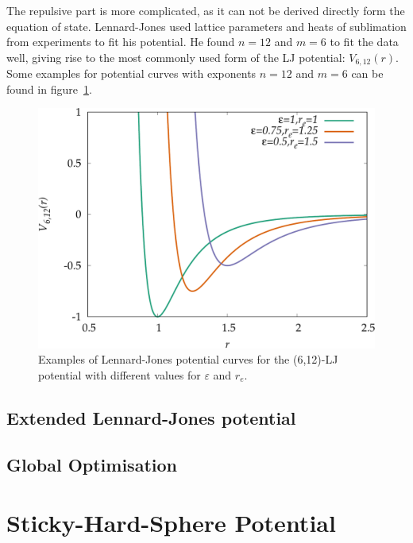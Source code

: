 The repulsive part is more complicated, as it can not be derived directly form
the equation of state. Lennard-Jones used lattice parameters and heats of
sublimation from experiments to fit his potential. He found $n=12$ and $m=6$ to
fit the data well, giving rise to the most commonly used form of the \ac{LJ}
potential: $V_{6,12}(r)$.\autocite{Lennard-Jones_Cohesion_1931} Some examples
for potential curves with exponents $n=12$ and $m=6$ can be found in
figure~\ref{fig:LJ-param}.
%
\begin{figure}[htb]
    \centering
    \includegraphics[width=.8\textwidth]{plot/LJ-param.pdf}
    \caption{Examples of Lennard-Jones potential curves for the (6,12)-\ac{LJ}
    potential with different values for $\varepsilon$ and $r_e$.}
    \label{fig:LJ-param}
\end{figure}

\subsection{Extended Lennard-Jones potential}
\label{sec:eLJ}

\subsection{Global Optimisation}
\label{sec:GlobalOptimisation}

\section{Sticky-Hard-Sphere Potential}
\label{sec:SHS}
